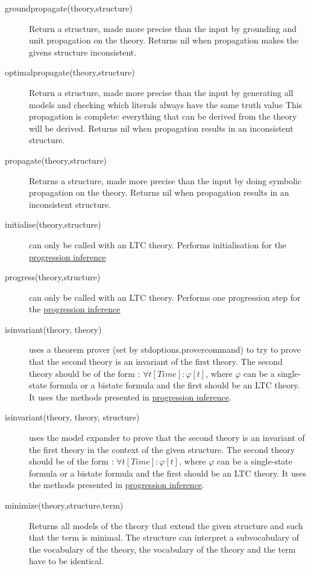 \begin{description}
 	\item[groundpropagate(theory,structure)]
 		Return a structure, made more precise than the input by grounding and unit propagation on the theory.
		Returns nil when propagation makes the givens structure inconsistent.
	\item[optimalpropagate(theory,structure)]
 		Return a structure, made more precise than the input by generating all models and checking which literals always have the same truth value
 		This propagation is complete: everything that can be derived from the theory will be derived. 
 		Returns nil when propagation results in an inconsistent structure.
	\item[propagate(theory,structure)]
 		Returns a structure, made more precise than the input by doing symbolic propagation on the theory.
 		Returns nil when propagation results in an inconsistent structure.
 	\item[initialise(theory,structure)] can only be called with an LTC theory. Performs initialisation for the \href{https://people.cs.kuleuven.be/~bart.bogaerts/articles/2014/001/Progression.pdf}{progression inference} 
 	\item[progress(theory,structure)] can only be called with an LTC theory. Performs one progression step for the \href{https://people.cs.kuleuven.be/~bart.bogaerts/articles/2014/001/Progression.pdf}{progression inference} 
	\item[isinvariant(theory, theory)] uses a theorem prover (set by stdoptions.provercommand) to try to prove that the second theory is an invariant of the first theory. The second theory should be of the form : $\forall t[Time]:\varphi[t]$, where $\varphi$ can be a single-state formula or a bistate formula and the first should be an LTC theory. It uses the methods presented in \href{https://people.cs.kuleuven.be/~bart.bogaerts/articles/2014/001/Progression.pdf}{progression inference}.
	\item[isinvariant(theory, theory, structure)] uses the model expander to prove that the second theory is an invariant of the first theory in the context of the given structure. The second theory should be of the form : $\forall t[Time]:\varphi[t]$, where $\varphi$ can be a single-state formula or a bistate formula and the first should be an LTC theory. It uses the methods presented in \href{https://people.cs.kuleuven.be/~bart.bogaerts/articles/2014/001/Progression.pdf}{progression inference}.
	\item[minimize(theory,structure,term)] Returns all models of the theory that extend the given structure and such that the term is minimal. The structure can interpret a subvocabulary of the vocabulary of the theory, the vocabulary of the theory and the term have to be identical.
	

\end{description}
